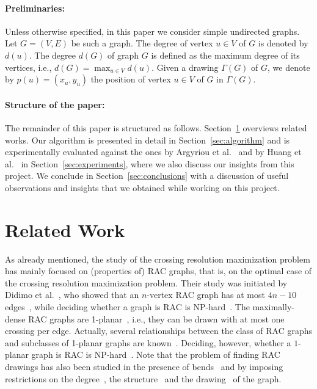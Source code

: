 \documentclass{comjnl}
\begin{document}
\paragraph{Preliminaries:}
Unless otherwise specified, in this paper we consider simple undirected graphs. Let $G=(V,E)$ be such a graph. The degree of vertex $u\in V$ of $G$ is denoted by $d(u)$. The degree $d(G)$ of  graph $G$ is defined as the maximum degree of its vertices, i.e., $d(G)=\max_{u\in V}d(u)$. Given a drawing $\Gamma(G)$ of $G$, we denote by $p(u)=(x_u,y_u)$ the position of vertex $u \in V$ of $G$ in $\Gamma(G)$. 

\paragraph{Structure of the paper:}
The remainder of this paper is structured as follows. Section~\ref{sec:relatedwork} overviews related works. Our algorithm is presented in detail in Section~\ref{sec:algorithm} and is experimentally evaluated against the ones by Argyriou et al.~\cite{DBLP:journals/cj/ArgyriouBS13} and by Huang et al.~\cite{DBLP:journals/vlc/HuangEHL13} in Section~\ref{sec:experiments}, where we also discuss our insights from this project. We conclude in Section~\ref{sec:conclusions} with a discussion of useful observations and insights that we obtained while working on this project.

\section{Related Work}
\label{sec:relatedwork}

As already mentioned, the study of the crossing resolution maximization problem has mainly focused on (properties of) RAC graphs, that is, on the optimal case of the crossing resolution maximization problem. Their study was initiated by Didimo et al.~\cite{DBLP:journals/tcs/DidimoEL11}, who showed that an $n$-vertex RAC graph has at most $4n-10$ edges~\cite{DBLP:journals/tcs/DidimoEL11}, while deciding whether a graph is RAC is NP-hard~\cite{DBLP:journals/jgaa/ArgyriouBS12}. The maximally-dense RAC graphs are 1-planar~\cite{DBLP:journals/dam/EadesL13}, i.e., they can be drawn with at most one crossing per edge. Actually, several relationships between the class of RAC graphs and subclasses of 1-planar graphs are known~\cite{DBLP:journals/dam/BachmaierBHNR17,DBLP:journals/tcs/BrandenburgDEKL16}. Deciding, however, whether a $1$-planar graph is RAC is NP-hard~\cite{DBLP:journals/tcs/BekosDLMM17}. Note that the problem of finding RAC drawings has also been studied in the presence of bends~\cite{DBLP:journals/jgaa/AngeliniCDFBKS11,DBLP:journals/comgeo/ArikushiFKMT12,DBLP:journals/tcs/DidimoEL11,DBLP:journals/mst/GiacomoDLM11} and by imposing restrictions on the degree~\cite{DBLP:conf/s-egc/AngeliniBDFHKLL11}, the structure~\cite{DBLP:journals/ipl/DidimoEL10} and the drawing~\cite{DBLP:journals/algorithmica/GiacomoDEL14,DBLP:conf/wg/HongN15} of the graph. 
\end{document}
